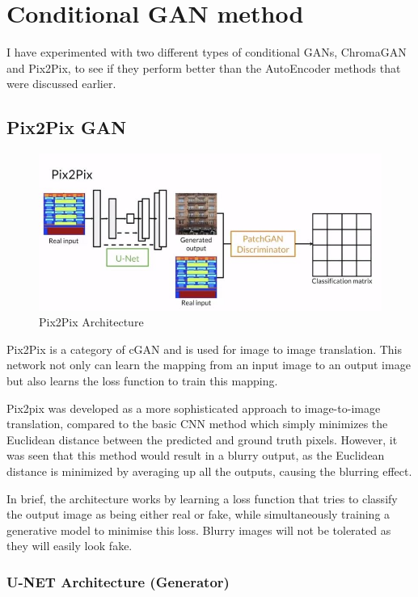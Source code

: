 \pagebreak
\section{Conditional GAN method}
I have experimented with two different types of conditional GANs, ChromaGAN and Pix2Pix, to see if they perform better than the AutoEncoder methods that were discussed earlier.

\subsection{Pix2Pix GAN}
\begin{figure}[H]
    \centering
    \includegraphics[width=1\columnwidth]{sections/figures/pix2pix_architecture.JPG}
    \caption{Pix2Pix Architecture}
    \label{fig:my_label}
\end{figure}

Pix2Pix is a category of cGAN and is used for image to image translation. This network not only can learn the mapping from an input image to an output image but also learns the loss function to train this mapping.

Pix2pix was developed as a more sophisticated approach to image-to-image translation, compared to the basic CNN method which simply minimizes the Euclidean distance between the predicted and ground truth pixels. However, it was seen that this method would result in a blurry output, as the Euclidean distance is minimized by averaging up all the outputs, causing the blurring effect.

In brief, the architecture works by learning a loss function that tries to classify the output image as being either real or fake, while simultaneously training a generative model to minimise this loss. Blurry images will not be tolerated as they will easily look fake.

\subsubsection*{U-NET Architecture (Generator)}

